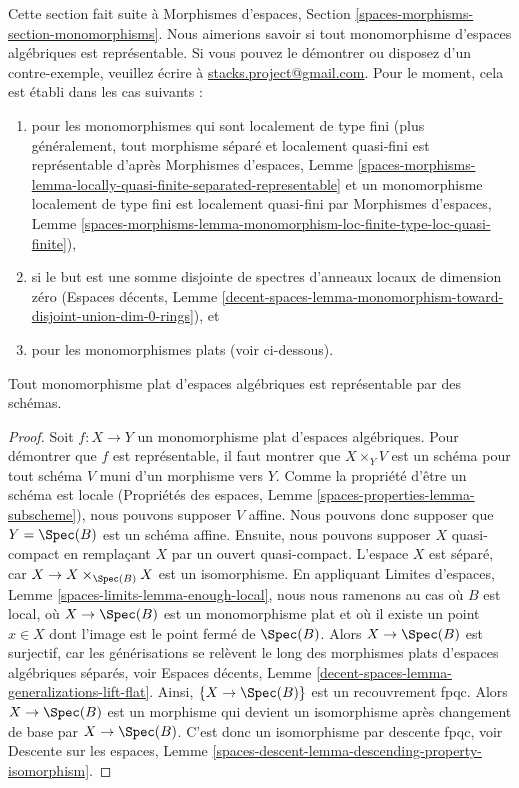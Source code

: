 \noindent
Cette section fait suite à
Morphismes d'espaces, Section \ref{spaces-morphisms-section-monomorphisms}.
Nous aimerions savoir si tout monomorphisme d'espaces
algébriques est représentable. Si vous pouvez le démontrer ou disposez d'un
contre-exemple, veuillez écrire à
\href{mailto:stacks.project@gmail.com}{stacks.project@gmail.com}.
Pour le moment, cela est établi dans les cas suivants :
\begin{enumerate}
\item pour les monomorphismes qui sont localement de type fini
(plus généralement, tout morphisme séparé et localement quasi-fini
est représentable d'après Morphismes d'espaces, Lemme
\ref{spaces-morphisms-lemma-locally-quasi-finite-separated-representable}
et un monomorphisme localement de type fini est
localement quasi-fini par Morphismes d'espaces, Lemme
\ref{spaces-morphisms-lemma-monomorphism-loc-finite-type-loc-quasi-finite}),
\item si le but est une somme disjointe de spectres d'anneaux locaux
de dimension zéro (Espaces décents, Lemme
\ref{decent-spaces-lemma-monomorphism-toward-disjoint-union-dim-0-rings}), et
\item pour les monomorphismes plats (voir ci-dessous).
\end{enumerate}

\begin{lemma}
\label{lemma-flat-case}
Tout monomorphisme plat d'espaces algébriques est représentable par des schémas.
\end{lemma}

\begin{proof}
Soit $f : X \to Y$ un monomorphisme plat d'espaces algébriques.
Pour démontrer que $f$ est représentable, il faut montrer que
$X \times_Y V$ est un schéma pour tout schéma $V$ muni d'un morphisme vers $Y$.
Comme la propriété d'être un schéma est locale (Propriétés des espaces, 
Lemme \ref{spaces-properties-lemma-subscheme}), nous pouvons
supposer $V$ affine. Nous pouvons donc supposer que $Y = \Spec(B)$
est un schéma affine. Ensuite, nous pouvons supposer $X$ quasi-compact
en remplaçant $X$ par un ouvert quasi-compact. L'espace $X$ est
séparé, car $X \to X \times_{\Spec(B)} X$ est un isomorphisme.
En appliquant Limites d'espaces, Lemme \ref{spaces-limits-lemma-enough-local},
nous nous ramenons au cas où $B$ est local, où $X \to \Spec(B)$ est un
monomorphisme plat et où
il existe un point $x \in X$ dont l'image est le point fermé de $\Spec(B)$.
Alors $X \to \Spec(B)$ est surjectif, car les générisations
se relèvent le long des morphismes plats d'espaces algébriques séparés, voir
Espaces décents, Lemme \ref{decent-spaces-lemma-generalizations-lift-flat}.
Ainsi, $\{X \to \Spec(B)\}$ est un recouvrement fpqc.
Alors $X \to \Spec(B)$ est un morphisme qui devient un isomorphisme
après changement de base par $X \to \Spec(B)$. C'est donc un isomorphisme par
descente fpqc, voir Descente sur les espaces, Lemme
\ref{spaces-descent-lemma-descending-property-isomorphism}.
\end{proof}

